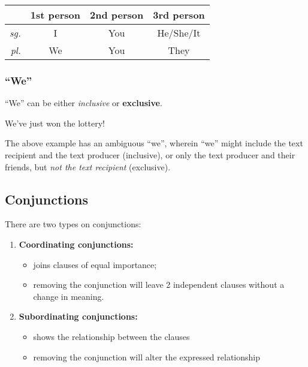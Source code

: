 \documentclass[../main.tex]{subfiles}
\begin{document}
	\begin{center}
		\begin{tabular}{rccc}
			\hline \hline
			& \textbf{1st person} & \textbf{2nd person} & \textbf{3rd person} \\ 
			\hline 
			\textit{sg.} & I & You & He/She/It \\ 
			\textit{pl.} & We & You & They \\ 
			\hline \hline
		\end{tabular} 
	\end{center}

	
	\subsubsection{``We''}
	``We'' can be either \textit{inclusive} or \textbf{exclusive}.
	\begin{exe}
		\ex We've just won the lottery!
	\end{exe}
	The above example has an ambiguous ``we'', wherein ``we'' might include the text recipient and the text producer (inclusive), or only the text producer and their friends, but \textit{not the text recipient} (exclusive).
	
	\subsection{Conjunctions}
	
	There are two types on conjunctions:
	\begin{enumerate}
		\item \textbf{Coordinating conjunctions:} \begin{itemize}
			\item joins clauses of equal importance;
			\item removing the conjunction will leave 2 independent clauses without a change in meaning.
		\end{itemize}
		\item \textbf{Subordinating conjunctions:} \begin{itemize}
			\item shows the relationship between the clauses
			\item removing the conjunction will alter the expressed relationship
		\end{itemize}
	\end{enumerate}
	
\end{document}

